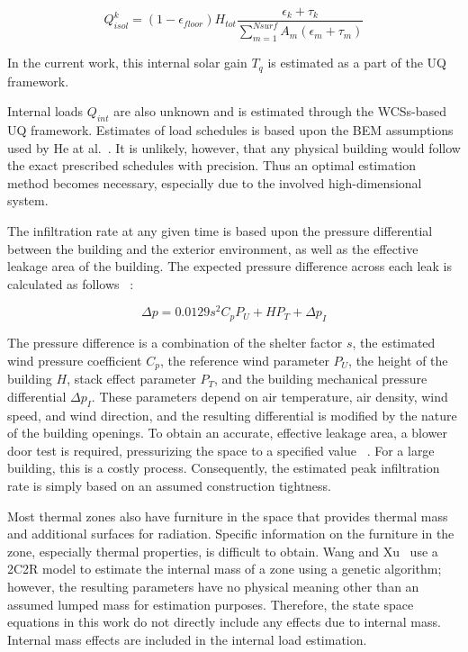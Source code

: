 \begin{equation}
Q^k_{isol} = (1-\epsilon_{floor})H_{tot}\frac{\epsilon_k+\tau_k}{\sum\limits_{m=1}^{Nsurf}A_m(\epsilon_m+\tau_m)}
\end{equation}

In the current work, this internal solar gain $T_q$ is estimated as a part of the UQ framework.

Internal loads $Q_{int}$ are also unknown and is estimated through the WCSs-based UQ framework. Estimates of load schedules is based upon the BEM assumptions used by He at al.~\citep{he2016simplified}.  It is unlikely, however, that any physical building would follow the exact prescribed schedules with precision. Thus an optimal estimation method becomes necessary, especially due to the involved high-dimensional system.

The infiltration rate at any given time is based upon the pressure differential between the building and the exterior environment, as well as the effective leakage area of the building.  The expected pressure difference across each leak is calculated as follows ~\citep{american20132013}:

\begin{equation}
\Delta p=0.0129s^2C_pP_U+HP_T+\Delta p_I
\end{equation}

The pressure difference is a combination of the shelter factor $s$, the estimated wind pressure coefficient $C_p$, the reference wind parameter $P_U$, the height of the building $H$, stack effect parameter $P_T$, and the building mechanical pressure differential $\Delta p_I$.  These parameters depend on air temperature, air density, wind speed, and wind direction, and the resulting differential is modified by the nature of the building openings.  To obtain an accurate, effective leakage area, a blower door test is required, pressurizing the space to a specified value ~\cite{american20132013}. For a large building, this is a costly process.  Consequently, the estimated peak infiltration rate is simply based on an assumed construction tightness.  

Most thermal zones also have furniture in the space that provides thermal mass and additional surfaces for radiation.  Specific information on the furniture in the zone, especially thermal properties, is difficult to obtain.  Wang and Xu~\citep{wang2006parameter} use a 2C2R model to estimate the internal mass of a zone using a genetic algorithm; however, the resulting parameters have no physical meaning other than an assumed lumped mass for estimation purposes.  Therefore, the state space equations in this work do not directly include any effects due to internal mass. Internal mass effects are included in the internal load estimation. 

